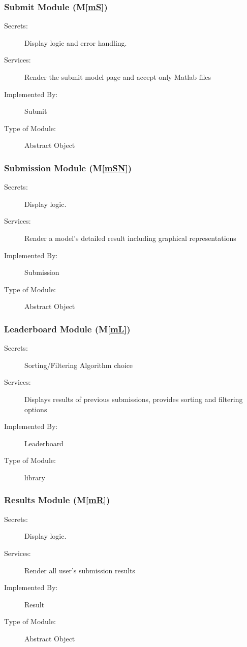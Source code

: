 \documentclass[12pt, titlepage]{article}
\newcommand{\mref}[1]{M\ref{#1}}
\begin{document}
\subsubsection{Submit Module (\mref{mS})}

\begin{description}
\item[Secrets:] Display logic and error handling.
\item[Services:] Render the submit model page and accept only Matlab files
\item[Implemented By:] Submit
\item[Type of Module:] Abstract Object
\end{description}

\subsubsection{Submission Module (\mref{mSN})}

\begin{description}
\item[Secrets:] Display logic.
\item[Services:] Render a model's detailed result including graphical representations
\item[Implemented By:] Submission
\item[Type of Module:] Abstract Object
\end{description}

\subsubsection{Leaderboard Module (\mref{mL})}

\begin{description}
\item[Secrets:] Sorting/Filtering Algorithm choice
\item[Services:] Displays results of previous submissions, provides sorting and filtering options
\item[Implemented By:] Leaderboard
\item[Type of Module:] library
\end{description}

\subsubsection{Results Module (\mref{mR})}

\begin{description}
\item[Secrets:] Display logic.
\item[Services:] Render all user's submission results
\item[Implemented By:] Result
\item[Type of Module:] Abstract Object
\end{description}
\end{document}
